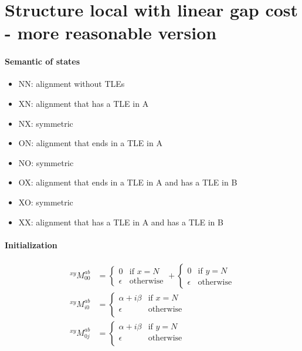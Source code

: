 \documentclass{article}
\begin{document}
\section{Structure local with linear gap cost - more reasonable version}

\paragraph{Semantic of states}
\begin{itemize}
\item NN: alignment without TLEs
\item XN: alignment that has a TLE in A
\item NX: symmetric
\item ON: alignment that ends in a TLE in A
\item NO: symmetric
\item OX: alignment that ends in a TLE in A and has a TLE in B
\item XO: symmetric
\item XX: alignment that has a TLE in A and has a TLE in B
\end{itemize}

\paragraph{Initialization}

\begin{align*}
  ^{xy}M^{ab}_{00}&=
  \begin{cases}
    0 & \text{if $x=N$}\\
    \epsilon & \text{otherwise}
  \end{cases}
  +
  \begin{cases}
    0 & \text{if $y=N$}\\
    \epsilon & \text{otherwise}
  \end{cases}
  \\
  ^{xy}M^{ab}_{i0}&=
  \begin{cases}
    \alpha + i\beta & \text{if $x=N$}\\
    \epsilon & \text{otherwise}\\
  \end{cases} \\
  ^{xy}M^{ab}_{0j}&=
  \begin{cases}
    \alpha + i\beta & \text{if $y=N$}\\
    \epsilon & \text{otherwise}\\
  \end{cases} \\
\end{align*}
\end{document}

